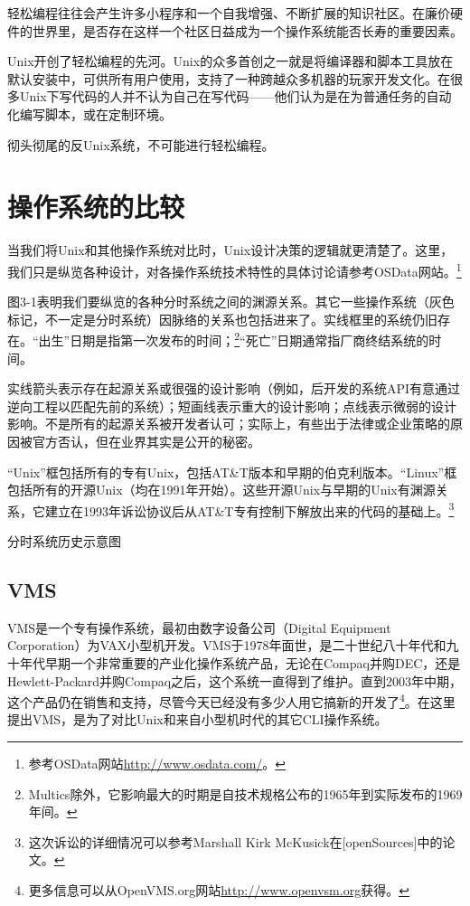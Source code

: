 \documentclass[11pt,oneside]{book}
\begin{document}
\begin{common-format}
轻松编程往往会产生许多小程序和一个自我增强、不断扩展的知识社区。在廉价硬件的世界里，是否存在这样一个社区日益成为一个操作系统能否长寿的重要因素。

Unix开创了轻松编程的先河。Unix的众多首创之一就是将编译器和脚本工具放在默认安装中，可供所有用户使用，支持了一种跨越众多机器的玩家开发文化。在很多Unix下写代码的人并不认为自己在写代码——他们认为是在为普通任务的自动化编写脚本，或在定制环境。

彻头彻尾的反Unix系统，不可能进行轻松编程。

\section{操作系统的比较}
当我们将Unix和其他操作系统对比时，Unix设计决策的逻辑就更清楚了。这里，我们只是纵览各种设计，对各操作系统技术特性的具体讨论请参考OSData网站。\footnote{参考OSData网站\href{http://www.osdata.com/}{http://www.osdata.com/}。}

图3-1表明我们要纵览的各种分时系统之间的渊源关系。其它一些操作系统（灰色标记，不一定是分时系统）因脉络的关系也包括进来了。实线框里的系统仍旧存在。“出生”日期是指第一次发布的时间；\footnote{Multics除外，它影响最大的时期是自技术规格公布的1965年到实际发布的1969年间。}“死亡”日期通常指厂商终结系统的时间。

实线箭头表示存在起源关系或很强的设计影响（例如，后开发的系统API有意通过逆向工程以匹配先前的系统）；短画线表示重大的设计影响；点线表示微弱的设计影响。不是所有的起源关系被开发者认可；实际上，有些出于法律或企业策略的原因被官方否认，但在业界其实是公开的秘密。

“Unix”框包括所有的专有Unix，包括AT\&{}T版本和早期的伯克利版本。“Linux”框包括所有的开源Unix（均在1991年开始）。这些开源Unix与早期的Unix有渊源关系，它建立在1993年诉讼协议后从AT\&{}T专有控制下解放出来的代码的基础上。\footnote{这次诉讼的详细情况可以参考Marshall Kirk McKusick在[openSources]中的论文。}

\begin{linefig}{分时系统历史示意图}
\label{fig:分时系统历史示意图}
\end{linefig}

\subsection{VMS}
VMS是一个专有操作系统，最初由数字设备公司（Digital Equipment Corporation）为VAX小型机开发。VMS于1978年面世，是二十世纪八十年代和九十年代早期一个非常重要的产业化操作系统产品，无论在Compaq并购DEC，还是Hewlett-Packard并购Compaq之后，这个系统一直得到了维护。直到2003年中期，这个产品仍在销售和支持，尽管今天已经没有多少人用它搞新的开发了\footnote{更多信息可以从OpenVMS.org网站\href{http://www.openvsm.org}{http://www.openvsm.org}获得。}。在这里提出VMS，是为了对比Unix和来自小型机时代的其它CLI操作系统。


\end{common-format}
\end{document}

